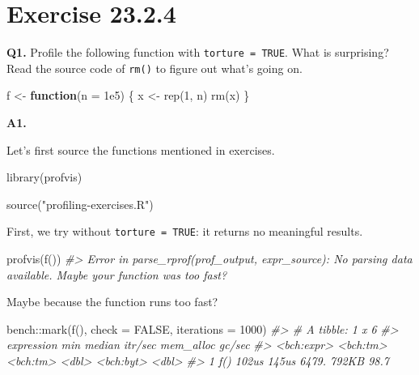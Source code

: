 \documentclass[
]{book}
\newenvironment{Shaded}{\begin{snugshade}}{\end{snugshade}}
\newcommand{\AttributeTok}[1]{\textcolor[rgb]{0.77,0.63,0.00}{#1}}
\newcommand{\CommentTok}[1]{\textcolor[rgb]{0.56,0.35,0.01}{\textit{#1}}}
\newcommand{\ConstantTok}[1]{\textcolor[rgb]{0.00,0.00,0.00}{#1}}
\newcommand{\ControlFlowTok}[1]{\textcolor[rgb]{0.13,0.29,0.53}{\textbf{#1}}}
\newcommand{\DecValTok}[1]{\textcolor[rgb]{0.00,0.00,0.81}{#1}}
\newcommand{\FloatTok}[1]{\textcolor[rgb]{0.00,0.00,0.81}{#1}}
\newcommand{\FunctionTok}[1]{\textcolor[rgb]{0.00,0.00,0.00}{#1}}
\newcommand{\NormalTok}[1]{#1}
\newcommand{\OtherTok}[1]{\textcolor[rgb]{0.56,0.35,0.01}{#1}}
\newcommand{\SpecialCharTok}[1]{\textcolor[rgb]{0.00,0.00,0.00}{#1}}
\newcommand{\StringTok}[1]{\textcolor[rgb]{0.31,0.60,0.02}{#1}}
\begin{document}
\hypertarget{exercise-23.2.4}{%
\section{Exercise 23.2.4}\label{exercise-23.2.4}}

\textbf{Q1.} Profile the following function with \texttt{torture\ =\ TRUE}. What is surprising? Read the source code of \texttt{rm()} to figure out what's going on.

\begin{Shaded}
\begin{Highlighting}[]
\NormalTok{f }\OtherTok{\textless{}{-}} \ControlFlowTok{function}\NormalTok{(}\AttributeTok{n =} \FloatTok{1e5}\NormalTok{) \{}
\NormalTok{  x }\OtherTok{\textless{}{-}} \FunctionTok{rep}\NormalTok{(}\DecValTok{1}\NormalTok{, n)}
  \FunctionTok{rm}\NormalTok{(x)}
\NormalTok{\}}
\end{Highlighting}
\end{Shaded}

\textbf{A1.}

Let's first source the functions mentioned in exercises.

\begin{Shaded}
\begin{Highlighting}[]
\FunctionTok{library}\NormalTok{(profvis)}

\FunctionTok{source}\NormalTok{(}\StringTok{"profiling{-}exercises.R"}\NormalTok{)}
\end{Highlighting}
\end{Shaded}

First, we try without \texttt{torture\ =\ TRUE}: it returns no meaningful results.

\begin{Shaded}
\begin{Highlighting}[]
\FunctionTok{profvis}\NormalTok{(}\FunctionTok{f}\NormalTok{())}
\CommentTok{\#\textgreater{} Error in parse\_rprof(prof\_output, expr\_source): No parsing data available. Maybe your function was too fast?}
\end{Highlighting}
\end{Shaded}

Maybe because the function runs too fast?

\begin{Shaded}
\begin{Highlighting}[]
\NormalTok{bench}\SpecialCharTok{::}\FunctionTok{mark}\NormalTok{(}\FunctionTok{f}\NormalTok{(), }\AttributeTok{check =} \ConstantTok{FALSE}\NormalTok{, }\AttributeTok{iterations =} \DecValTok{1000}\NormalTok{)}
\CommentTok{\#\textgreater{} \# A tibble: 1 x 6}
\CommentTok{\#\textgreater{}   expression      min   median \textasciigrave{}itr/sec\textasciigrave{} mem\_alloc \textasciigrave{}gc/sec\textasciigrave{}}
\CommentTok{\#\textgreater{}   \textless{}bch:expr\textgreater{} \textless{}bch:tm\textgreater{} \textless{}bch:tm\textgreater{}     \textless{}dbl\textgreater{} \textless{}bch:byt\textgreater{}    \textless{}dbl\textgreater{}}
\CommentTok{\#\textgreater{} 1 f()           102us    145us     6479.     792KB     98.7}
\end{Highlighting}
\end{Shaded}
\end{document}
